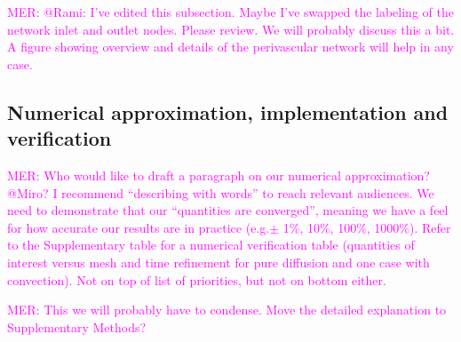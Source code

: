 \documentclass[fleqn,10pt]{wlscirep}
\newcommand{\mer}[1]{\textcolor{magenta}{#1}}
\begin{document}
\noindent \mer{MER: @Rami: I've edited this subsection. Maybe I've swapped the labeling of the network inlet and outlet nodes. Please review. We will probably discuss this a bit. A figure showing overview and details of the perivascular network will help in any case.}


\subsection*{Numerical approximation, implementation and verification}

\mer{MER: Who would like to draft a paragraph on our numerical approximation? @Miro? I recommend ``describing with words'' to reach relevant audiences. We need to demonstrate that our ``quantities are converged'', meaning we have a feel for how accurate our results are in practice (e.g.$\pm$ 1\%, 10\%, 100\%, 1000\%). Refer to the Supplementary table for a numerical verification table (quantities of interest versus mesh and time refinement for pure diffusion and one case with convection). Not on top of list of priorities, but not on bottom either.} 



\mer{MER: This we will probably have to condense. Move the detailed explanation to Supplementary Methods?}
\end{document}
